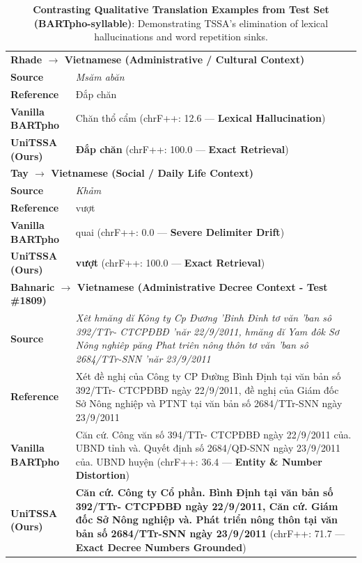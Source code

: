 \begin{table}[t]
\centering\small
\caption{\textbf{Contrasting Qualitative Translation Examples from Test Set (BARTpho-syllable)}: Demonstrating TSSA's elimination of lexical hallucinations and word repetition sinks.}
\label{tab:qualitative_bartpho}
\vspace{4pt}
\begin{tabular}{lp{}}
\toprule
\multicolumn{2}{l}{\textbf{Rhade $\rightarrow$ Vietnamese (Administrative / Cultural Context)}} \\
\textbf{Source} & \textit{Msăm abăn} \\
\textbf{Reference} & Đắp chăn \\
\textbf{Vanilla BARTpho} & \textcolor{BrickRed}{Chăn thổ cẩm (chrF++: 12.6 --- \textbf{Lexical Hallucination})} \\
\textbf{UniTSSA (Ours)} & \textcolor{topgreen}{\textbf{Đắp chăn} (chrF++: 100.0 --- \textbf{Exact Retrieval})} \\
\midrule
\multicolumn{2}{l}{\textbf{Tay $\rightarrow$ Vietnamese (Social / Daily Life Context)}} \\
\textbf{Source} & \textit{Khảm} \\
\textbf{Reference} & vượt \\
\textbf{Vanilla BARTpho} & \textcolor{BrickRed}{quai (chrF++: 0.0 --- \textbf{Severe Delimiter Drift})} \\
\textbf{UniTSSA (Ours)} & \textcolor{topgreen}{\textbf{vượt} (chrF++: 100.0 --- \textbf{Exact Retrieval})} \\
\midrule
\multicolumn{2}{l}{\textbf{Bahnaric $\rightarrow$ Vietnamese (Administrative Decree Context - Test \#1809)}} \\
\textbf{Source} & \textit{Xêt hmăng dĭ Kông ty Cp Đương 'Binh Đinh tơ văn 'ban sô 392/TTr- CTCPĐBĐ 'năr 22/9/2011, hmăng dĭ Yam đôk Sơ Nông nghiêp păng Phat triên nông thôn tơ văn 'ban sô 2684/TTr-SNN 'năr 23/9/2011} \\
\textbf{Reference} & Xét đề nghị của Công ty CP Đường Bình Định tại văn bản số 392/TTr- CTCPĐBĐ ngày 22/9/2011, đề nghị của Giám đốc Sở Nông nghiệp và PTNT tại văn bản số 2684/TTr-SNN ngày 23/9/2011 \\
\textbf{Vanilla BARTpho} & \textcolor{BrickRed}{Căn cứ. Công văn số 394/TTr- CTCPĐBĐ ngày 22/9/2011 của. UBND tỉnh và. Quyết định số 2684/QĐ-SNN ngày 23/9/2011 của. UBND huyện (chrF++: 36.4 --- \textbf{Entity \& Number Distortion})} \\
\textbf{UniTSSA (Ours)} & \textcolor{topgreen}{\textbf{Căn cứ. Công ty Cổ phần. Bình Định tại văn bản số 392/TTr- CTCPĐBĐ ngày 22/9/2011, Căn cứ. Giám đốc Sở Nông nghiệp và. Phát triển nông thôn tại văn bản số 2684/TTr-SNN ngày 23/9/2011} (chrF++: 71.7 --- \textbf{Exact Decree Numbers Grounded})} \\
\bottomrule
\end{tabular}
\end{table}
